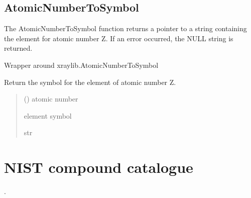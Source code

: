 \documentclass[letterpaper,10pt,english,openany,oneside]{sphinxmanual}
\begin{document}
\subsection{AtomicNumberToSymbol}
\label{\detokenize{api/compound_parser:atomicnumbertosymbol}}
\sphinxAtStartPar
The AtomicNumberToSymbol function returns a pointer to a string containing the
element for atomic number Z. If an error occurred, the NULL string is returned.

\begin{fulllineitems}
\label{\detokenize{api/compound_parser:dxraylib.AtomicNumberToSymbol}}
\pysigstartsignatures
{}
\pysigstopsignatures
\sphinxAtStartPar
Wrapper around xraylib.AtomicNumberToSymbol

\sphinxAtStartPar
Return the symbol for the element of atomic number Z.
\begin{quote}\begin{description}
\sphinxAtStartPar
{} () \textendash{} atomic number

\sphinxAtStartPar
element symbol

\sphinxAtStartPar
str

\end{description}\end{quote}

\end{fulllineitems}


\sphinxstepscope


\section{NIST compound catalogue}
\label{\detokenize{api/nist:nist-compound-catalogue}}\label{\detokenize{api/nist::doc}}
\sphinxAtStartPar
{}.
\end{document}
